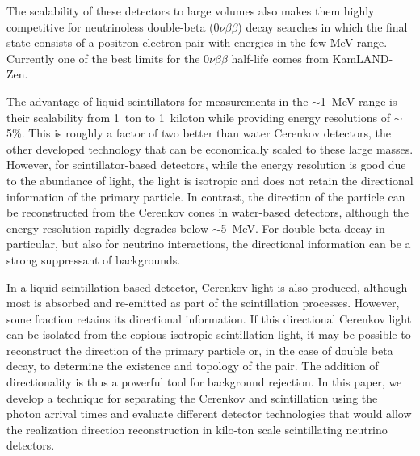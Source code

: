 \documentclass[aps,prc,twocolumn,groupedaddress,showpacs,amsmath,amssymb,floatfix,superscriptaddress]{revtex4}
\begin{document}
The scalability of these detectors to large volumes also makes them
highly competitive for neutrinoless double-beta ($0\nu\beta\beta$)
decay searches in which the final state consists of a
positron-electron pair with energies in the few MeV range.  Currently
one of the best limits for the $0\nu\beta\beta$ half-life comes from
KamLAND-Zen\cite{KZ0nu}.

The advantage of liquid scintillators for measurements in the
$\sim$1~MeV range is their scalability from 1~ton to 1~kiloton while
providing energy resolutions of $\sim$5\%. This is roughly a factor of
two better than water Cerenkov detectors, the other developed
technology that can be economically scaled to these large
masses. However, for scintillator-based detectors, while the energy
resolution is good due to the abundance of light, the light is
isotropic and does not retain the directional information of the
primary particle.  In contrast, the direction of the particle can be
reconstructed from the Cerenkov cones in water-based detectors,
although the energy resolution rapidly degrades below $\sim$5~MeV. For
double-beta decay in particular, but also for neutrino interactions,
the directional information can be a strong suppressant of
backgrounds.

In a liquid-scintillation-based detector, Cerenkov light is also
produced, although most is absorbed and re-emitted as part of the
scintillation processes.  However, some fraction retains its
directional information. If this directional Cerenkov light can be
isolated from the copious isotropic scintillation light, it may be
possible to reconstruct the direction of the primary particle or, in
the case of double beta decay, to determine the existence and topology
of the pair.  The addition of directionality is thus a powerful tool
for background rejection.  In this paper, we develop a technique for
separating the Cerenkov and scintillation using the photon arrival
times and evaluate different detector technologies that would allow
the realization direction reconstruction in kilo-ton scale
scintillating neutrino detectors.
\end{document}
